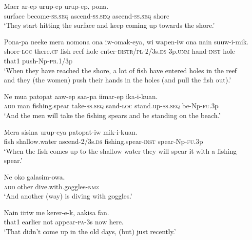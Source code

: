 \ea\label{ex:a:x27}
\gll  Maer  ar-ep  urup-ep  urup-ep,  pona. \\
surface  become-\textsc{ss.seq}  ascend-\textsc{ss.seq}  ascend-\textsc{ss.seq}  shore \\
\glt ‘They start hitting the surface and keep coming up towards the shore.’ \\
\z


\ea\label{ex:a:x28}
\gll  Pona-pa  neeke  mera  nomona  ona  iw-omak-eya,          wi  wapen-iw  ona  nain  suuw-i-mik. \\
shore-\textsc{loc}  there.\textsc{cf}  fish  reef  hole  enter-\textsc{distr}/\textsc{pl}-2/3s.\textsc{ds}  3p.\textsc{unm}  hand-\textsc{inst}  hole  that1  push{}-Np-\textsc{pr}.1/3p \\


\glt ‘When they have reached the shore, a lot of fish have entered holes in the reef and they (the women) push their hands in the holes (and pull the fish out).’ \\
\z


\ea\label{ex:a:x29}
\gll  Ne  mua  patopat  aaw-ep  saa-pa  iimar-ep                  ika-i-kuan. \\
\textsc{add}  man  fishing.spear  take-\textsc{ss.seq}  sand-\textsc{loc}  stand.up-\textsc{ss.seq}   be-Np-\textsc{fu}.3p \\


\glt ‘And the men will take the fishing spears and be standing on the beach.’ \\
\z


\ea\label{ex:a:x30}
\gll  Mera  sisina  urup-eya  patopat-iw                 mik-i-kuan. \\
fish  shallow.water  ascend-2/3s.\textsc{ds}  fishing.spear-\textsc{inst}  spear-Np-\textsc{fu}.3p \\


\glt ‘When the fish comes up to the shallow water they will spear it with a fishing spear.’ \\
\z


\ea\label{ex:a:x31}
\gll  Ne  oko  galasim-owa. \\
\textsc{add}  other  dive.with.goggles-\textsc{nmz} \\
\glt ‘And another (way) is diving with goggles.’ \\
\z


\ea\label{ex:a:x32}
\gll  Nain  iiriw  me  kerer-e-k,  aakisa  fan. \\
that1  earlier  not  appear-\textsc{pa}-3s  now  here. \\
\glt ‘That didn’t come up in the old days, (but) just recently.’ \\
\z


